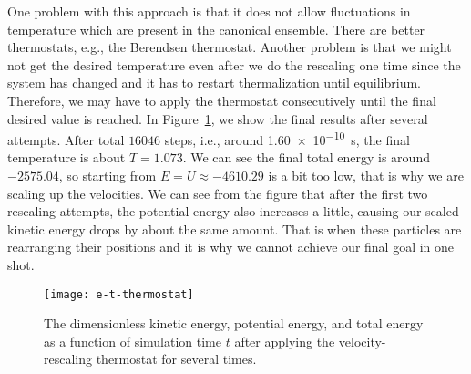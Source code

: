 One problem with this approach is that it does not
allow fluctuations in temperature which are present in the canonical ensemble.
There are better thermostats, e.g., the Berendsen thermostat.
Another problem is that we might not get the desired temperature even after we do the
rescaling one time since the system has changed and it has to restart thermalization
until equilibrium. Therefore, we may have to apply the thermostat consecutively
until the final desired value is reached.
In Figure~\ref{fig:md-thermostat}, we show the final results after several attempts.
After total $16046$ steps, i.e., around \qty{1.60e-10}{\second}, the final temperature is
about $T = 1.073$.
We can see the final total energy is around $-2575.04$, so starting from
$E = U \approx -4610.29$ is a bit too low, that is why we are scaling up the velocities.
We can see from the figure that after the first two rescaling attempts, the potential
energy also increases a little, causing our scaled kinetic energy drops by about the
same amount. That is when these particles are rearranging their positions and
it is why we cannot achieve our final goal in one shot.

\begin{figure}
    \centering
    \texttt{[image: e-t-thermostat]}
    \caption{The dimensionless kinetic energy, potential energy, and total energy
        as a function of simulation time $t$ after applying the velocity-rescaling
        thermostat for several times.}
    \label{fig:md-thermostat}
\end{figure}
